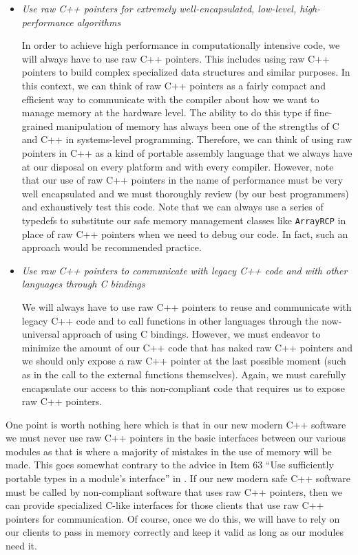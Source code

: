 \documentclass[pdf,ps2pdf,11pt]{SANDreport}
\begin{document}
\begin{itemize}

{}\item{}\textit{Use raw C++ pointers for extremely well-encapsulated,
low-level, high-performance algorithms}

In order to achieve high performance in computationally intensive
code, we will always have to use raw C++ pointers.  This includes
using raw C++ pointers to build complex specialized data structures
and similar purposes.  In this context, we can think of raw C++
pointers as a fairly compact and efficient way to communicate with the
compiler about how we want to manage memory at the hardware level.
The ability to do this type if fine-grained manipulation of memory
has always been one of the strengths of C and C++ in systems-level
programming.  Therefore, we can think of using raw pointers in C++ as
a kind of portable assembly language that we always have at our
disposal on every platform and with every compiler.  However, note
that our use of raw C++ pointers in the name of performance must be
very well encapsulated and we must thoroughly review (by our best
programmers) and exhaustively test this code.  Note that we can always
use a series of typedefs to substitute our safe memory management
classes like {}\texttt{ArrayRCP} in place of raw C++ pointers when we
need to debug our code.  In fact, such an approach would be
recommended practice.

{}\item{}\textit{Use raw C++ pointers to communicate with legacy C++
code and with other languages through C bindings}

We will always have to use raw C++ pointers to reuse and communicate
with legacy C++ code and to call functions in other languages through
the now-universal approach of using C bindings.  However, we must
endeavor to minimize the amount of our C++ code that has naked raw C++
pointers and we should only expose a raw C++ pointer at the last
possible moment (such as in the call to the external functions
themselves).  Again, we must carefully encapsulate our access to this
non-compliant code that requires us to expose raw C++ pointers.

\end{itemize}

One point is worth nothing here which is that in our new modern C++
software we must never use raw C++ pointers in the basic interfaces
between our various modules as that is where a majority of mistakes in
the use of memory will be made.  This goes somewhat contrary to the
advice in Item 63 ``Use sufficiently portable types in a module's
interface'' in {}\cite{C++CodingStandards05}.  If our new modern safe
C++ software must be called by non-compliant software that uses raw
C++ pointers, then we can provide specialized C-like interfaces for
those clients that use raw C++ pointers for communication.  Of course,
once we do this, we will have to rely on our clients to pass in memory
correctly and keep it valid as long as our modules need it.
\end{document}
